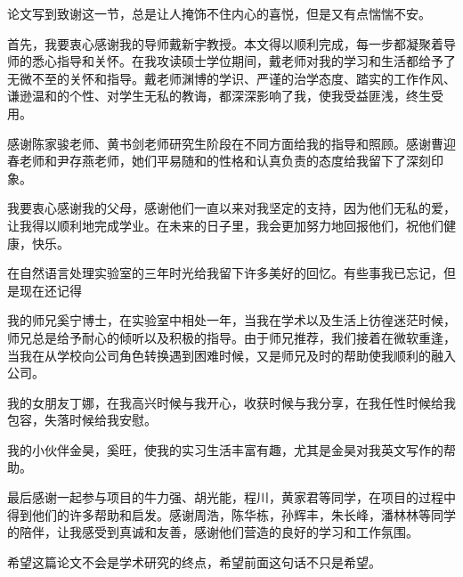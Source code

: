 \documentclass[master]{njuthesis}
\begin{document}
\begin{acknowledgement}
    
    论文写到致谢这一节，总是让人掩饰不住内心的喜悦，但是又有点惴惴不安。
     
    首先，我要衷心感谢我的导师戴新宇教授。本文得以顺利完成，每一步都凝聚着导师的悉心指导和关怀。在我攻读硕士学位期间，戴老师对我的学习和生活都给予了无微不至的关怀和指导。戴老师渊博的学识、严谨的治学态度、踏实的工作作风、谦逊温和的个性、对学生无私的教诲，都深深影响了我，使我受益匪浅，终生受用。

    感谢陈家骏老师、黄书剑老师研究生阶段在不同方面给我的指导和照顾。感谢曹迎春老师和尹存燕老师，她们平易随和的性格和认真负责的态度给我留下了深刻印象。

    我要衷心感谢我的父母，感谢他们一直以来对我坚定的支持，因为他们无私的爱，让我得以顺利地完成学业。在未来的日子里，我会更加努力地回报他们，祝他们健康，快乐。

    在自然语言处理实验室的三年时光给我留下许多美好的回忆。有些事我已忘记，但是现在还记得
   
    我的师兄奚宁博士，在实验室中相处一年，当我在学术以及生活上彷徨迷茫时候，师兄总是给予耐心的倾听以及积极的指导。由于师兄推荐，我们接着在微软重逢，当我在从学校向公司角色转换遇到困难时候，又是师兄及时的帮助使我顺利的融入公司。
  
    我的女朋友丁娜，在我高兴时候与我开心，收获时候与我分享，在我任性时候给我包容，失落时候给我安慰。

    我的小伙伴金昊，奚旺，使我的实习生活丰富有趣，尤其是金昊对我英文写作的帮助。
  
    最后感谢一起参与项目的牛力强、胡光能，程川，黄家君等同学，在项目的过程中得到他们的许多帮助和启发。感谢周浩，陈华栋，孙辉丰，朱长峰，潘林林等同学的陪伴，让我感受到真诚和友善，感谢他们营造的良好的学习和工作氛围。
   
    希望这篇论文不会是学术研究的终点，希望前面这句话不只是希望。

\end{acknowledgement}



\backmatter

\end{document}
